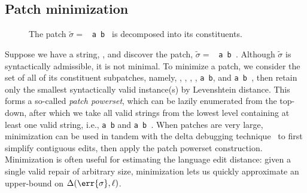 \documentclass[runningheads]{llncs}
\begin{document}
\subsection{Patch minimization}\label{sec:minimization}

\begin{wrapfigure}{r}{0.45\textwidth}
  \vspace{-20pt}
  \caption{The patch $\tilde{\sigma}=$ \texttt{\hlgreen{(} a \hlorange{+} b \hlgreen{)}} is decomposed into its constituents.}
  \vspace{-20pt}
\end{wrapfigure}

Suppose we have a string, \texttt{}, and discover the patch, $\tilde{\sigma}=$ \texttt{\hlgreen{(} a \hlorange{+} b \hlgreen{)}}. Although $\tilde{\sigma}$ is syntactically admissible, it is not minimal. To minimize a patch, we consider the set of all of its constituent subpatches, namely, \texttt{}, \texttt{}, \texttt{}, \texttt{}, \texttt{a \hlorange{+} b}, and \texttt{a \hlgreen{(} b \hlgreen{)}}, then retain only the smallest syntactically valid instance(s) by Levenshtein distance. This forms a so-called \textit{patch powerset}, which can be lazily enumerated from the top-down, after which we take all valid strings from the lowest level containing at least one valid string, i.e., \texttt{a \hlorange{+} b} and \texttt{a \hlgreen{(} b \hlgreen{)}}. When patches are very large, minimization can be used in tandem with the delta debugging technique~\cite{zeller2002isolating} to first simplify contiguous edits, then apply the patch powerset construction. Minimization is often useful for estimating the language edit distance: given a single valid repair of arbitrary size, minimization lets us quickly approximate an upper-bound on $\Delta(\err{\sigma}, \ell)$.
\end{document}
